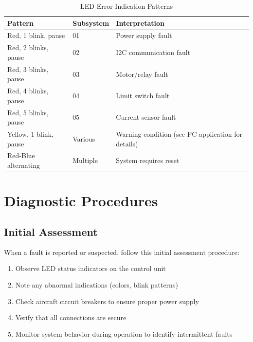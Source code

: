 \documentclass[12pt,a4paper,twoside,openright]{book}
\newcommand{\tabletextfont}{\normalfont\rmfamily}
\newcommand{\tableheadfont}{\normalfont\bfseries}
\begin{document}
\begin{table}[h]
\centering
\setlength{\tabcolsep}{5pt} %
\begin{tabular}{|p{}|p{}|p{}|}
\hline
\tableheadfont\textbf{Pattern} & \tableheadfont\textbf{Subsystem} & \tableheadfont\textbf{Interpretation} \\
\hline
\tabletextfont Red, 1 blink, pause & 01 & Power supply fault \\
\hline
\tabletextfont Red, 2 blinks, pause & 02 & I2C communication fault \\
\hline
\tabletextfont Red, 3 blinks, pause & 03 & Motor/relay fault \\
\hline
\tabletextfont Red, 4 blinks, pause & 04 & Limit switch fault \\
\hline
\tabletextfont Red, 5 blinks, pause & 05 & Current sensor fault \\
\hline
\tabletextfont Yellow, 1 blink, pause & Various & Warning condition (see PC application for details) \\
\hline
\tabletextfont Red-Blue alternating & Multiple & System requires reset \\
\hline
\end{tabular}
\caption{LED Error Indication Patterns}
\end{table}

\section{Diagnostic Procedures}

\subsection{Initial Assessment}

When a fault is reported or suspected, follow this initial assessment procedure:

\begin{enumerate}
    \item Observe LED status indicators on the control unit
    \item Note any abnormal indications (colors, blink patterns)
    \item Check aircraft circuit breakers to ensure proper power supply
    \item Verify that all connections are secure
    \item Monitor system behavior during operation to identify intermittent faults
\end{enumerate}
\end{document}
